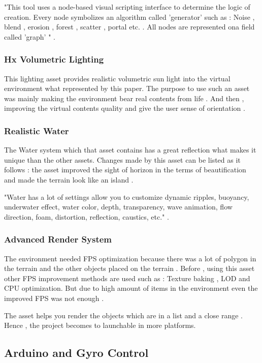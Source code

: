 "This tool uses a node-based visual scripting interface to determine the logic of creation. Every node symbolizes an algorithm called 'generator' such as : Noise , blend , erosion , forest , scatter , portal etc. . All nodes are represented ona field called 'graph' " \cite{denispahunov} .

\subsubsection{Hx Volumetric Lighting}

This lighting asset provides  realistic volumetric sun light into the virtual environment what represented by this paper. The purpose to use such an asset was mainly making the environment bear real contents from life . And then , improving the virtual contents quality and give the user sense of orientation .

\subsubsection{Realistic Water}  
The Water system which that asset contains has a great reflection what makes it unique than the other assets. Changes made by this asset can be listed as it follows : the asset improved the sight of horizon in the terms of beautification and made the terrain look like an island  .
 
"Water has a lot of settings allow you to customize dynamic ripples, buoyancy, underwater effect, water color, depth, transparency, wave animation, flow direction, foam, distortion, reflection, caustics, etc." \cite{water}.

\subsubsection{Advanced Render System}
The environment needed FPS optimization because there was a lot of polygon in the terrain and the other objects placed on the terrain . Before , using this asset other FPS improvement methods are used such as :  Texture baking , LOD and CPU optimization. But due to high amount of items in the environment even the improved FPS was not enough . 

The asset helps you render the objects which are in a list and a close range . Hence , the project becomes to launchable in more platforms.


\subsection{Arduino and Gyro Control}

